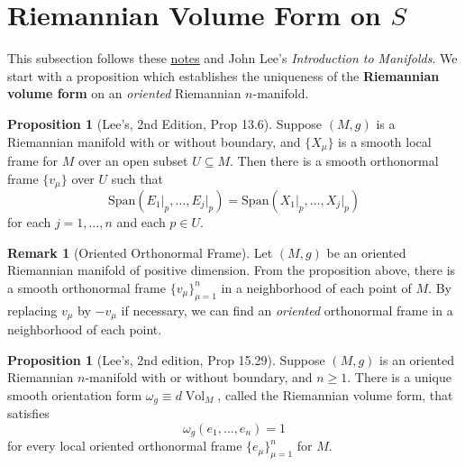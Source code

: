 \documentclass{article}
\theoremstyle{definition}
\theoremstyle{theorem}
\newtheorem{proposition}[theorem]{Proposition}
\newtheorem{remark}{Remark}
\newcommand{\Vol}{\operatorname{Vol}}
\begin{document}
\section{Riemannian Volume Form on $S$}

This subsection follows these \href{http://www.math.toronto.edu/vtk/1300Fall2015/lecture-nov24.pdf}{\underline{notes}} and John Lee's \textit{Introduction to Manifolds}. We start with a proposition which establishes the uniqueness of the \textbf{Riemannian volume form} on an \textit{oriented} Riemannian $n$-manifold. 

\begin{proposition}[Lee's, 2nd Edition, Prop 13.6]
Suppose $(M,g)$ is a Riemannian manifold with or without boundary, and $\{ X_\mu \}$ is a smooth local frame for $M$ over an open subset $U\subseteq M$. Then there is a smooth orthonormal frame $\{v_\mu \}$ over $U$ such that 
\begin{equation*}
    \text{Span}(E_1\vert_p, \dots, E_j\vert_p) = \text{Span}(X_1\vert_p, \dots, X_j\vert_p) 
\end{equation*}
for each $j = 1,\dots,n$ and each $p\in U$. 
\end{proposition}


\begin{remark}[Oriented Orthonormal Frame]
Let $(M,g)$ be an oriented Riemannian manifold of positive dimension. From the proposition above, there is a smooth orthonormal frame $\{ v_\mu\}^n_{\mu = 1}$ in a neighborhood of each point of $M$. By replacing $v_\mu$ by $-v_\mu$ if necessary, we can find an \textit{oriented} orthonormal frame in a neighborhood of each point. 
\end{remark}

\begin{proposition}[Lee's, 2nd edition, Prop 15.29]\label{prop:Lee15.29}
Suppose $(M,g)$ is an oriented Riemannian $n$-manifold with or without boundary, and $n\geq 1$. There is a unique smooth orientation form $\omega_g \equiv d\Vol_M$, called the Riemannian volume form, that satisfies
\begin{equation*}
    \omega_g(e_1,\dots,e_n) = 1
\end{equation*}
for every local oriented orthonormal frame $\{e_\mu\}_{\mu = 1}^n$ for $M$.
\end{proposition}
\end{document}
